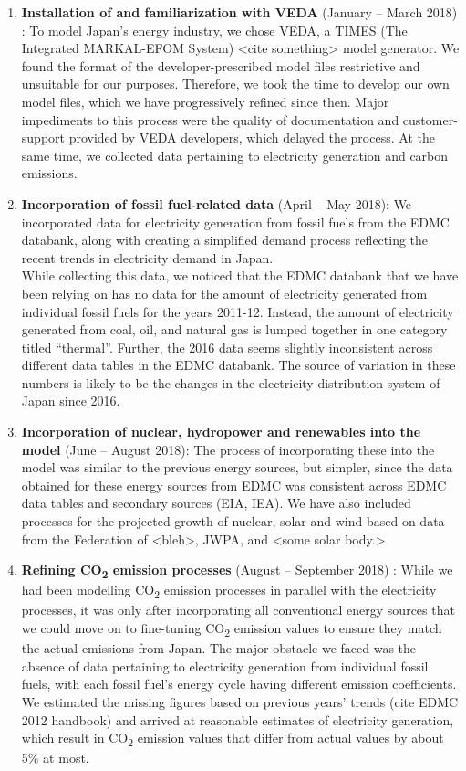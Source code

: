 \documentclass[14pt,a4paper]{article} %
\begin{document}
\begin{enumerate}
\item \textbf{Installation of and familiarization with VEDA} (January – March 2018) : To model Japan’s energy industry, we chose VEDA, a TIMES (The Integrated MARKAL-EFOM System) <cite something> model generator. We found the format of the developer-prescribed model files restrictive and unsuitable for our purposes. Therefore, we took the time to develop our own model files, which we have progressively refined since then. Major impediments to this process were the quality of documentation and customer-support provided by VEDA developers, which delayed the process.
At the same time, we collected data pertaining to electricity generation and carbon emissions.

\item \textbf{Incorporation of fossil fuel-related data} (April – May 2018): We incorporated data for electricity generation from fossil fuels from the EDMC databank, along with creating a simplified demand process reflecting the recent trends in electricity demand in Japan. \\

While collecting this data, we noticed that the EDMC databank that we have been relying on has no data for the amount of electricity generated from individual fossil fuels for the years 2011-12. Instead, the amount of electricity generated from coal, oil, and natural gas is lumped together in one category titled “thermal”. Further, the 2016 data seems slightly inconsistent across different data tables in the EDMC databank. The source of variation in these numbers is likely to be the changes in the electricity distribution system of Japan since 2016.

\item \textbf{Incorporation of nuclear, hydropower and renewables into the model} (June – August 2018): The process of incorporating these into the model was similar to the previous energy sources, but simpler, since the data obtained for these energy sources from EDMC was consistent across EDMC data tables and secondary sources (EIA, IEA). We have also included processes for the projected growth of nuclear, solar and wind based on data from the Federation of <bleh>, JWPA, and <some solar body.>

\item \textbf{Refining CO\textsubscript{2} emission processes} (August – September 2018) : While we had been modelling CO\textsubscript{2} emission processes in parallel with the electricity processes, it was only after incorporating all conventional energy sources that we could move on to fine-tuning CO\textsubscript{2} emission values to ensure they match the actual emissions from Japan. The major obstacle we faced was the absence of data pertaining to electricity generation from individual fossil fuels, with each fossil fuel’s energy cycle having different emission coefficients. We estimated the missing figures based on previous years’ trends (cite EDMC 2012 handbook) and arrived at reasonable estimates of electricity generation, which result in CO\textsubscript{2} emission values that differ from actual values by about 5\% at most.


\end{enumerate}
\end{document}

